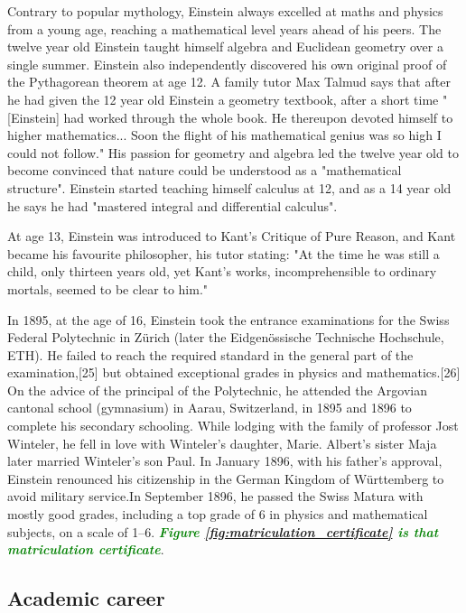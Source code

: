 \documentclass{article}
\begin{document}
Contrary to popular mythology, Einstein always excelled at maths and physics from a young age, reaching a mathematical level years ahead of his peers. The twelve year old Einstein taught himself algebra and Euclidean geometry over a single summer. Einstein also independently discovered his own original proof of the Pythagorean theorem at age 12. A family tutor Max Talmud says that after he had given the 12 year old Einstein a geometry textbook, after a short time "[Einstein] had worked through the whole book. He thereupon devoted himself to higher mathematics... Soon the flight of his mathematical genius was so high I could not follow." His passion for geometry and algebra led the twelve year old to become convinced that nature could be understood as a "mathematical structure". Einstein started teaching himself calculus at 12, and as a 14 year old he says he had "mastered integral and differential calculus".


At age 13, Einstein was introduced to Kant's Critique of Pure Reason, and Kant became his favourite philosopher, his tutor stating: "At the time he was still a child, only thirteen years old, yet Kant's works, incomprehensible to ordinary mortals, seemed to be clear to him."


In 1895, at the age of 16, Einstein took the entrance examinations for the Swiss Federal Polytechnic in Zürich (later the Eidgenössische Technische Hochschule, ETH). He failed to reach the required standard in the general part of the examination,[25] but obtained exceptional grades in physics and mathematics.[26] On the advice of the principal of the Polytechnic, he attended the Argovian cantonal school (gymnasium) in Aarau, Switzerland, in 1895 and 1896 to complete his secondary schooling. While lodging with the family of professor Jost Winteler, he fell in love with Winteler's daughter, Marie. Albert's sister Maja later married Winteler's son Paul. In January 1896, with his father's approval, Einstein renounced his citizenship in the German Kingdom of Württemberg to avoid military service.In September 1896, he passed the Swiss Matura with mostly good grades, including a top grade of 6 in physics and mathematical subjects, on a scale of 1–6. \textcolor{green}{\textit{\textbf{Figure \ref{fig:matriculation_certificate} is that matriculation certificate}}}.


\newpage

\subsection{Academic career}
\end{document}

